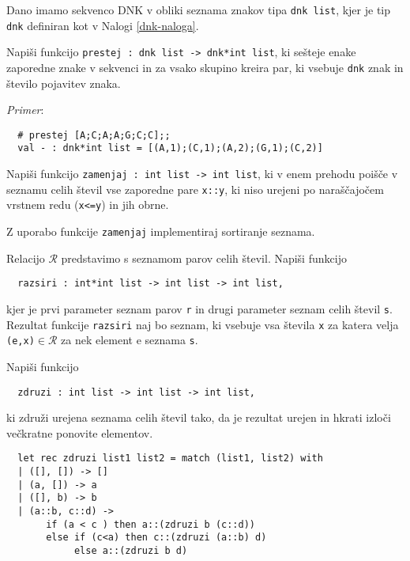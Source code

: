 \begin{ex}
  Dano imamo sekvenco DNK v obliki seznama znakov tipa \lstinline{dnk list},
  kjer je tip \lstinline{dnk} definiran kot v Nalogi \ref{dnk-naloga}.

  Napi\v si funkcijo \lstinline{prestej : dnk list -> dnk*int list}, ki
  se\v steje enake zaporedne znake v sekvenci in za vsako skupino
  kreira par, ki vsebuje \lstinline{dnk} znak in \v stevilo pojavitev
  znaka.

  \emph{Primer}: 
  \begin{lstlisting}
  # prestej [A;C;A;A;G;C;C];;
  val - : dnk*int list = [(A,1);(C,1);(A,2);(G,1);(C,2)]
  \end{lstlisting}
\end{ex} 



\begin{ex}
  Napi\v si funkcijo \lstinline{zamenjaj : int list -> int list}, ki v
  enem prehodu poi\v s\v ce v seznamu celih \v stevil vse zaporedne
  pare \lstinline{x::y}, ki niso urejeni po nara\v s\v cajo\v cem vrstnem
  redu (\lstinline{x<=y}) in jih obrne.

  Z uporabo funkcije \lstinline{zamenjaj} implementiraj sortiranje seznama.
\end{ex} 



\begin{ex}
  Relacijo $\mathcal{R}$ predstavimo s seznamom parov celih \v
  stevil. Napi\v si funkcijo

  \begin{lstlisting}
  razsiri : int*int list -> int list -> int list,
  \end{lstlisting}

  kjer je prvi parameter seznam parov \lstinline{r} in drugi parameter
  seznam celih \v stevil \lstinline{s}. Rezultat funkcije
  \lstinline{razsiri} naj bo seznam, ki vsebuje vsa \v stevila \lstinline{x}
  za katera velja \lstinline{(e,x)}$\in\mathcal{R}$ za nek element e
  seznama \lstinline{s}.
\end{ex} 



\begin{ex}
  Napi\v si funkcijo

  \begin{lstlisting}
  zdruzi : int list -> int list -> int list,
\end{lstlisting}

  ki zdru\v zi urejena seznama celih \v stevil tako, da je rezultat
  urejen in hkrati izlo\v ci ve\v ckratne ponovite elementov.

  \begin{sol}
  \begin{lstlisting}
  let rec zdruzi list1 list2 = match (list1, list2) with
  | ([], []) -> []
  | (a, []) -> a
  | ([], b) -> b
  | (a::b, c::d) -> 
       if (a < c ) then a::(zdruzi b (c::d))
       else if (c<a) then c::(zdruzi (a::b) d)
            else a::(zdruzi b d)
  \end{lstlisting}
  \end{sol}
\end{ex} 




